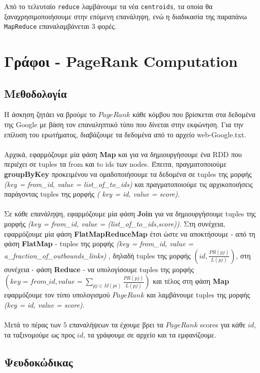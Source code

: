 \documentclass{ntua}
\begin{document}
\noindent
Από το τελευταίο \texttt{reduce} λαμβάνουμε τα νέα \texttt{centroids}, τα οποία θα ξαναχρησιμοποιήσουμε στην επόμενη επανάληψη, ενώ η διαδικασία της παραπάνω \texttt{MapReduce} επαναλαμβάνεται 3 φορές.

\newpage

\section{Γράφοι - PageRank Computation}

\subsection{Μεθοδολογία}
H άσκηση ζητάει να βρούμε το $PageRank$ κάθε κόμβου που βρίσκεται στα δεδομένα της Google με βάση τον επαναληπτικό τύπο που δίνεται στην εκφώνηση. Για την επίλυση του ερωτήματος, διαβάζουμε τα δεδομένα από το αρχείο web-Google.txt.\\ \\
Αρχικά, εφαρμόζουμε μία φάση \textbf{Map} και για να δημιουργήσουμε ένα RDD που περιέχει σε tuples τα from και to ids των nodes. Έπειτα, πραγματοποιούμε \textbf{groupByKey} προκειμένου να ομαδοποιήσουμε τα δεδομένα σε tuples της μορφής \emph{(key = from\_id, value = list\_of\_to\_ids)} και πραγματοποιούμε τις αρχικοποιήσεις παράγοντας tuples της μορφής \emph{( key = id, value = score)}.\\ \\
Σε κάθε επανάληψη, εφαρμόζουμε μία φάση \textbf{Join} για να δημιουργήσουμε tuples της μορφής \emph{(key = from\_id, value = (list\_of\_to\_ids,score))}. Στη συνέχεια, εφαρμόζουμε μία φάση \textbf{FlatMapReduceMap} έτσι ώστε να αποκτήσουμε - από τη φάση \textbf{FlatMap} - tuples της μορφής \emph{(key = from\_id, value = a\_fraction\_of\_outbounds\_links)} , δηλαδή tuples της μορφής $(id, \frac{PR(pj)}{L(pj)})$, στη συνέχεια - φάση \textbf{Reduce} - να υπολογίσουμε tuples της μορφής $( key = from\_id, value =\sum_{pj\in{M(pi)}}^{} \frac{PR(pj)}{L(pj)}) $ και τέλος στη φάση \textbf{Map} εφαρμόζουμε τον τύπο υπολογισμού $PageRank$ και λαμβάνουμε tuples της μορφής \emph{(key = id, value = score)}.\\ \\
Μετά το πέρας των $5$ επαναλήψεων τα έχουμε βρει τα $PageRank$ scores για κάθε $id$, τα ταξινομούμε ως προς $id$, τα γράφουμε σε αρχείο και τα εμφανίζουμε.

\subsection{Ψευδοκώδικας}
\end{document}

